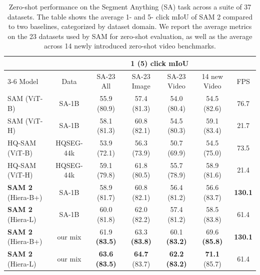 \documentclass[]{fairmeta}
\begin{document}
\begin{table}[t]
\vspace{10pt}
\centering
\small
\begin{tabular}{lcccccc}
&  &
  \multicolumn{4}{c}{1 (5) click mIoU} &
   \\
\cmidrule(lr){3-6}
Model  & \multicolumn{1}{c}{Data} &
  \multicolumn{1}{c}{SA-23 All} &
  \multicolumn{1}{c}{SA-23 Image} &
  \multicolumn{1}{c}{SA-23 Video} &
  \multicolumn{1}{c}{14 new Video} &
   \multicolumn{1}{c}{FPS}
  \\
\midrule


  
SAM (ViT-B) & SA-1B &
  55.9 (80.9) &
  57.4 (81.3) &
  54.0 (80.4) &
  54.5 (82.6) &
  76.7 \\
SAM (ViT-H) & SA-1B & 
  58.1 (81.3) &
  60.8 (82.1) &
  54.5 (80.3) &
  59.1 (83.4) &
  21.7 \\
HQ-SAM (ViT-B) & HQSEG-44k &
  53.9 (72.1) &
  56.3 (73.9) &
  50.7 (69.9) &
  54.5 (75.0) &
  73.5 \\
HQ-SAM (ViT-H) & HQSEG-44k &
  59.1 (79.8) &
  61.8 (80.5) &
  55.7 (78.9) & 
  58.9 (81.6) &
  21.4 \\
\midrule
\textbf{SAM 2} (Hiera-B+) & SA-1B & 
  58.9 (81.7) &
  60.8 (82.1) &
  56.4 (81.2) &
  56.6 (83.7) &
  \textbf{130.1} \\ 
\textbf{SAM 2} (Hiera-L) & SA-1B & 
  60.0 (81.8) &
  62.0 (82.2) &
  57.4 (81.2) &
  58.5 (83.8) &
  61.4 \\ 
\midrule

\textbf{SAM 2} (Hiera-B+) & our mix & 
  61.9 \textbf{(83.5)} &
  63.3 \textbf{(83.8)} &
  60.1 \textbf{(83.2)} &
  69.6 \textbf{(85.8)} &
  \textbf{130.1} \\ 
  
\textbf{SAM 2} (Hiera-L) & our mix & 
  \textbf{63.6} \textbf{(83.5)} &
  \textbf{64.7} (83.7) &
  \textbf{62.2} \textbf{(83.2)}&
  \textbf{71.1} (85.7) &

  61.4 \\ 

\end{tabular}
\caption{Zero-shot performance on the Segment Anything (SA) task across a suite of 37 datasets. The table shows the average 1- and 5- click mIoU of SAM 2 compared to two baselines, categorized by dataset domain. We report the average metrics on the 23 datasets used by SAM for zero-shot evaluation, as well as the average across 14 newly introduced zero-shot video benchmarks.}
\label{tab:sam_zs_comparison_full}
\vspace{5pt}
\end{table}
\end{document}
